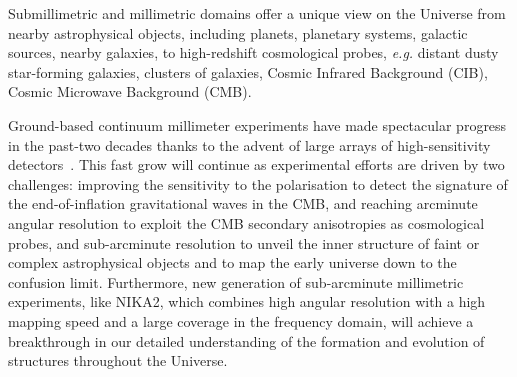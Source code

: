 %

Submillimetric and millimetric domains offer a unique view on the
Universe from nearby astrophysical objects, including planets,
planetary systems, galactic sources, nearby galaxies, to high-redshift
cosmological probes, \emph{e.g.} distant dusty star-forming galaxies,
clusters of galaxies, Cosmic Infrared Background (CIB), Cosmic Microwave
Background (CMB).

Ground-based {\lp continuum} millimeter experiments have made spectacular progress in
the past-two decades thanks to the advent of large arrays of
high-sensitivity detectors~\citep{Wilson2008_AZTEC,
  Siringo2009_LABOCA, Swetz2011_ACT, Bleem2012_SPT, Monfardini2011_NIKA, Holland2013_SCUBA2,
  Dicker2014_MUSTANG2, Adam2017}. %
This fast grow will continue as experimental efforts are
driven by two challenges: improving the sensitivity to the
polarisation to detect the signature of
the end-of-inflation gravitational waves in the CMB, and reaching
arcminute angular resolution to exploit the CMB secondary anisotropies
as cosmological probes, and sub-arcminute resolution to unveil the
inner structure of faint or complex astrophysical objects and to map
the early universe down to the confusion limit. Furthermore, new
generation of sub-arcminute millimetric experiments, like NIKA2, which
combines high angular resolution with a high mapping speed and a large
coverage in the frequency domain, will achieve a breakthrough in 
our detailed understanding of the formation and evolution of
structures throughout the Universe.

